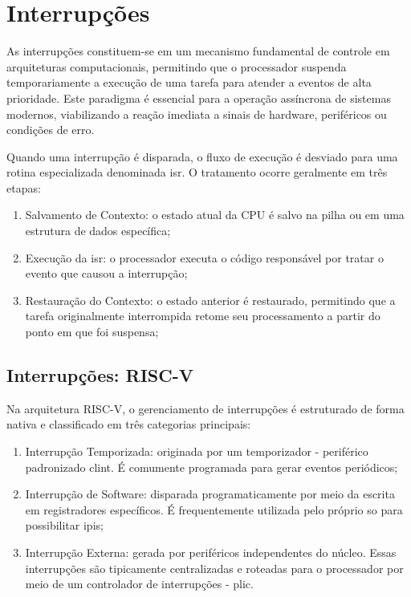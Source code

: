 \section{Interrupções}

As interrupções constituem-se em um mecanismo fundamental de controle em arquiteturas computacionais, permitindo que o processador suspenda temporariamente a execução
de uma tarefa para atender a eventos de alta prioridade. Este paradigma é essencial para a operação assíncrona de sistemas modernos, viabilizando a reação imediata
a sinais de hardware, periféricos ou condições de erro.

Quando uma interrupção é disparada, o fluxo de execução é desviado para uma rotina especializada denominada \gls{isr}.
O tratamento ocorre geralmente em três etapas:

\begin{enumerate}
    \item Salvamento de Contexto: o estado atual da CPU é salvo na pilha ou em uma estrutura de dados específica;
    \item Execução da \gls{isr}: o processador executa o código responsável por tratar o evento que causou a interrupção;
    \item Restauração do Contexto: o estado anterior é restaurado, permitindo que a tarefa originalmente interrompida retome seu processamento a partir do ponto em que foi suspensa;
\end{enumerate}

\subsection{Interrupções: RISC-V}

Na arquitetura RISC-V, o gerenciamento de interrupções é estruturado de forma nativa e classificado em três categorias principais:

\begin{enumerate}
	\item Interrupção Temporizada: originada por um temporizador - periférico padronizado \gls{clint}. É comumente programada para gerar eventos periódicos;
	\item Interrupção de Software: disparada programaticamente por meio da escrita em registradores específicos. É frequentemente utilizada pelo próprio \gls{so} para possibilitar \glspl{ipi};
	\item Interrupção Externa: gerada por periféricos independentes do núcleo. Essas interrupções são tipicamente centralizadas e roteadas para o processador por meio de um controlador de interrupções - \gls{plic}.
\end{enumerate}





